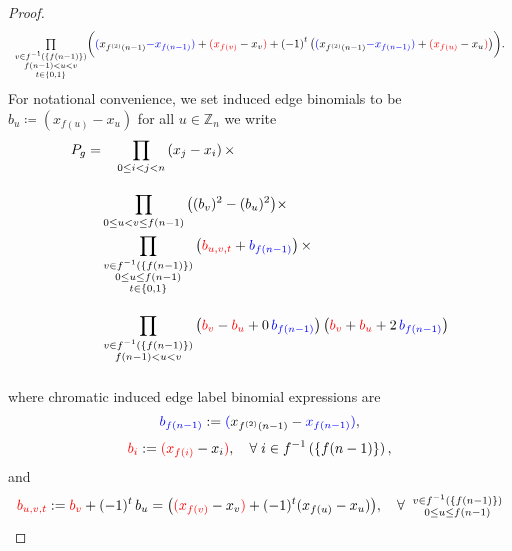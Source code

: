\begin{proof}
\[\begin{array}{c}
\underset{
    \substack{
        v \in f^{-1}\left(\left\{ f\left(n-1\right)\right\} \right) \\
        f\left(n-1\right) < u < v \\
        t \in \left\{ 0, 1 \right\}
    }
}{\prod}
\bigg(
    {\color{blue}(}x_{f^{\left(2\right)}\left(n-1\right)} 
    {\color{blue}- x_{f\left(n-1\right)}}{\color{blue})} 
    + {\color{red}(x_{f\left(v\right)}} - x_{v}{\color{red})} 
    + \left(-1\right)^{t} 
    \big(
        {\color{blue}(}x_{f^{\left(2\right)}\left(n-1\right)} 
        {\color{blue}- x_{f\left(n-1\right)}}{\color{blue})} 
        + {\color{red}(x_{f\left(u\right)}} - x_{u}{\color{red})} 
    \big)
\bigg).
\end{array}
\]
For notational convenience, we set induced edge binomials to be $b_u\coloneq \left(x_{f(u)}-x_{u}\right)$  for all $u\in \mathbb{Z}_n$ we write 
\begin{equation}
\begin{aligned}P_{g}= & \quad\prod_{0\leq i<j<n}\left(x_{j}-x_{i}\right)\times\\[10pt]
 & \prod_{0\leq u<v\leq f\left(n-1\right)}\big((b_{v})^{2}-(b_{u})^{2}\big)\times\\
 & \prod_{\substack{v\in f^{-1}\left(\{f(n-1)\}\right)\\
0\leq u\leq f\left(n-1\right)\\
t\in\{0,1\}
}
}\left({\color{red}b_{u,v,t}}+{\color{blue}b_{f(n-1)}}\right)\times\\[10pt]
 & \prod_{\substack{v\in f^{-1}\left(\{f(n-1)\}\right)\\
f\left(n-1\right)<u<v
}
}\left({\color{red}b_{v}}-{\color{red}b_{u}}+0\,{\color{blue}b_{f(n-1)}}\right)\left({\color{red}b_{v}}+{\color{red}b_{u}}+2\,{\color{blue}b_{f(n-1)}}\right)\\[10pt]
\end{aligned}
\label{eq:Pg_telescoping}
\end{equation}
where chromatic induced edge label binomial expressions are
\[
{\color{blue} b_{f(n-1)}} \coloneq {\color{blue} (} x_{f^{(2)}(n-1)} - {\color{blue} x_{f(n-1)} )},
\]
\[
{\color{red} b_{i}} \coloneq {\color{red} ( x_{f(i)} }- x_{i}  {\color{red} )}, 
\quad \forall \; i \in f^{-1}\left(\{f(n-1)\}\right),
\]
and
\[
{\color{red}b_{u,v,t}}\coloneq{\color{red}b_{v}}+(-1)^{t}\,b_{u}=\big({\color{red}(x_{f(v)}}-x_{v}{\color{red})}+(-1)^{t}(x_{f(u)}-x_{u})\big),\quad\forall\;\;\substack{v\in f^{-1}\left(\{f(n-1)\}\right)\\
0\leq u\leq f(n-1)\\
}\]
\end{proof}
